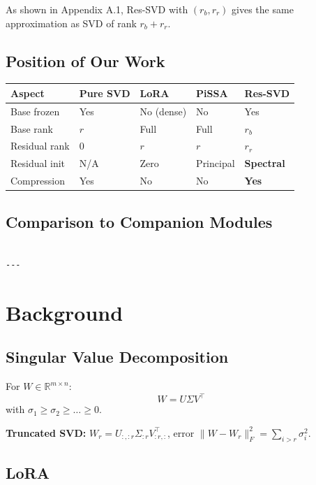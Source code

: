 As shown in Appendix A.1, Res-SVD with $(r_b, r_r)$ gives the same 
approximation as SVD of rank $r_b + r_r$.

\subsection{Position of Our Work}

\begin{table}[H]
\centering
\small
\begin{tabular}{lllll}
\toprule
\textbf{Aspect} & \textbf{Pure SVD} & \textbf{LoRA} & \textbf{PiSSA} & \textbf{Res-SVD} \\
\midrule
Base frozen & Yes & No (dense) & No & Yes \\
Base rank & $r$ & Full & Full & $r_b$ \\
Residual rank & 0 & $r$ & $r$ & $r_r$ \\
Residual init & N/A & Zero & Principal & \textbf{Spectral} \\
Compression & Yes & No & No & \textbf{Yes} \\
\bottomrule
\end{tabular}
\end{table}

\subsection{Comparison to Companion Modules}

\begin{lstlisting}

---
\end{lstlisting}

\section{Background}

\subsection{Singular Value Decomposition}

For $W \in \mathbb{R}^{m \times n}$:
\[
W = U \Sigma V^\top
\tag{3.1}
\]
with $\sigma_1 \geq \sigma_2 \geq \dots \geq 0$.

\textbf{Truncated SVD:} $W_r = U_{:, :r} \Sigma_{:r} V_{:r, :}^\top$, error 
$\|W - W_r\|_F^2 = \sum_{i > r} \sigma_i^2$.

\subsection{LoRA}

